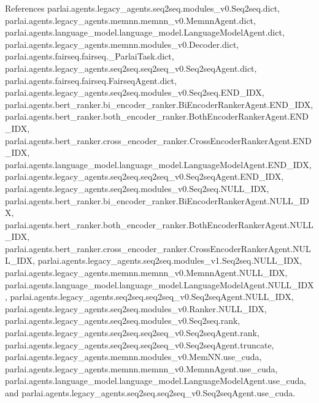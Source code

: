 References parlai.\+agents.\+legacy\+\_\+agents.\+seq2seq.\+modules\+\_\+v0.\+Seq2seq.\+dict, parlai.\+agents.\+legacy\+\_\+agents.\+memnn.\+memnn\+\_\+v0.\+Memnn\+Agent.\+dict, parlai.\+agents.\+language\+\_\+model.\+language\+\_\+model.\+Language\+Model\+Agent.\+dict, parlai.\+agents.\+legacy\+\_\+agents.\+memnn.\+modules\+\_\+v0.\+Decoder.\+dict, parlai.\+agents.\+fairseq.\+fairseq.\+\_\+\+Parlai\+Task.\+dict, parlai.\+agents.\+legacy\+\_\+agents.\+seq2seq.\+seq2seq\+\_\+v0.\+Seq2seq\+Agent.\+dict, parlai.\+agents.\+fairseq.\+fairseq.\+Fairseq\+Agent.\+dict, parlai.\+agents.\+legacy\+\_\+agents.\+seq2seq.\+modules\+\_\+v0.\+Seq2seq.\+E\+N\+D\+\_\+\+I\+DX, parlai.\+agents.\+bert\+\_\+ranker.\+bi\+\_\+encoder\+\_\+ranker.\+Bi\+Encoder\+Ranker\+Agent.\+E\+N\+D\+\_\+\+I\+DX, parlai.\+agents.\+bert\+\_\+ranker.\+both\+\_\+encoder\+\_\+ranker.\+Both\+Encoder\+Ranker\+Agent.\+E\+N\+D\+\_\+\+I\+DX, parlai.\+agents.\+bert\+\_\+ranker.\+cross\+\_\+encoder\+\_\+ranker.\+Cross\+Encoder\+Ranker\+Agent.\+E\+N\+D\+\_\+\+I\+DX, parlai.\+agents.\+language\+\_\+model.\+language\+\_\+model.\+Language\+Model\+Agent.\+E\+N\+D\+\_\+\+I\+DX, parlai.\+agents.\+legacy\+\_\+agents.\+seq2seq.\+seq2seq\+\_\+v0.\+Seq2seq\+Agent.\+E\+N\+D\+\_\+\+I\+DX, parlai.\+agents.\+legacy\+\_\+agents.\+seq2seq.\+modules\+\_\+v0.\+Seq2seq.\+N\+U\+L\+L\+\_\+\+I\+DX, parlai.\+agents.\+bert\+\_\+ranker.\+bi\+\_\+encoder\+\_\+ranker.\+Bi\+Encoder\+Ranker\+Agent.\+N\+U\+L\+L\+\_\+\+I\+DX, parlai.\+agents.\+bert\+\_\+ranker.\+both\+\_\+encoder\+\_\+ranker.\+Both\+Encoder\+Ranker\+Agent.\+N\+U\+L\+L\+\_\+\+I\+DX, parlai.\+agents.\+bert\+\_\+ranker.\+cross\+\_\+encoder\+\_\+ranker.\+Cross\+Encoder\+Ranker\+Agent.\+N\+U\+L\+L\+\_\+\+I\+DX, parlai.\+agents.\+legacy\+\_\+agents.\+seq2seq.\+modules\+\_\+v1.\+Seq2seq.\+N\+U\+L\+L\+\_\+\+I\+DX, parlai.\+agents.\+legacy\+\_\+agents.\+memnn.\+memnn\+\_\+v0.\+Memnn\+Agent.\+N\+U\+L\+L\+\_\+\+I\+DX, parlai.\+agents.\+language\+\_\+model.\+language\+\_\+model.\+Language\+Model\+Agent.\+N\+U\+L\+L\+\_\+\+I\+DX, parlai.\+agents.\+legacy\+\_\+agents.\+seq2seq.\+seq2seq\+\_\+v0.\+Seq2seq\+Agent.\+N\+U\+L\+L\+\_\+\+I\+DX, parlai.\+agents.\+legacy\+\_\+agents.\+seq2seq.\+modules\+\_\+v0.\+Ranker.\+N\+U\+L\+L\+\_\+\+I\+DX, parlai.\+agents.\+legacy\+\_\+agents.\+seq2seq.\+modules\+\_\+v0.\+Seq2seq.\+rank, parlai.\+agents.\+legacy\+\_\+agents.\+seq2seq.\+seq2seq\+\_\+v0.\+Seq2seq\+Agent.\+rank, parlai.\+agents.\+legacy\+\_\+agents.\+seq2seq.\+seq2seq\+\_\+v0.\+Seq2seq\+Agent.\+truncate, parlai.\+agents.\+legacy\+\_\+agents.\+memnn.\+modules\+\_\+v0.\+Mem\+N\+N.\+use\+\_\+cuda, parlai.\+agents.\+legacy\+\_\+agents.\+memnn.\+memnn\+\_\+v0.\+Memnn\+Agent.\+use\+\_\+cuda, parlai.\+agents.\+language\+\_\+model.\+language\+\_\+model.\+Language\+Model\+Agent.\+use\+\_\+cuda, and parlai.\+agents.\+legacy\+\_\+agents.\+seq2seq.\+seq2seq\+\_\+v0.\+Seq2seq\+Agent.\+use\+\_\+cuda.



